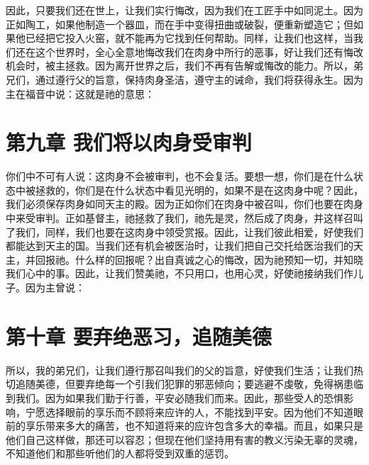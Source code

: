 因此，只要我们还在世上，让我们实行悔改，因为我们在工匠手中如同泥土。因为正如陶工，如果他制造一个器皿，而在手中变得扭曲或破裂，便重新塑造它；但如果他已经把它投入火窑，就不能再为它找到任何帮助。同样，让我们也这样，当我们还在这个世界时，全心全意地悔改我们在肉身中所行的恶事，好让我们还有悔改机会时，被主拯救。因为离开世界之后，我们不再有告解或悔改的能力。所以，弟兄们，通过遵行父的旨意，保持肉身圣洁，遵守主的诫命，我们将获得永生。因为主在福音中说：这就是祂的意思：\par


\section{第九章 我们将以肉身受审判}

你们中不可有人说：这肉身不会被审判，也不会复活。要想一想，你们是在什么状态中被拯救的，你们是在什么状态中看见光明的，如果不是在这肉身中呢？因此，我们必须保存肉身如同天主的殿。因为正如你们在肉身中被召叫，你们也要在肉身中来受审判。正如基督主，祂拯救了我们，祂先是灵，然后成了肉身，并这样召叫了我们，同样，我们也要在这肉身中领受赏报。因此，让我们彼此相爱，好使我们都能达到天主的国。当我们还有机会被医治时，让我们把自己交托给医治我们的天主，并回报祂。什么样的回报呢？出自真诚之心的悔改，因为祂预知一切，并知晓我们心中的事。因此，让我们赞美祂，不只用口，也用心灵，好使祂接纳我们作儿子。因为主曾说：\par


\section{第十章 要弃绝恶习，追随美德}

所以，我的弟兄们，让我们遵行那召叫我们的父的旨意，好使我们生活；让我们热切追随美德，但要弃绝每一个引我们犯罪的邪恶倾向；要逃避不虔敬，免得祸患临到我们。因为如果我们勤于行善，平安必随我们而来。因此，那些受人的恐惧影响，宁愿选择眼前的享乐而不顾将来应许的人，不能找到平安。因为他们不知道眼前的享乐带来多大的痛苦，也不知道将来的应许包含多大的幸福。而且，如果只是他们自己这样做，那还可以容忍；但现在他们坚持用有害的教义污染无辜的灵魂，不知道他们和那些听他们的人都将受到双重的惩罚。\par

